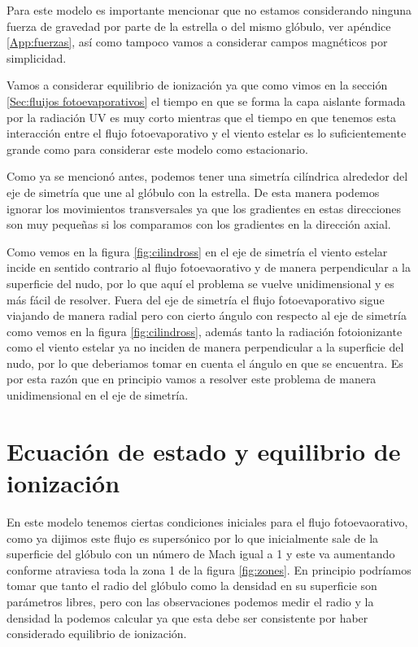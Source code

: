 \documentclass{book}
\begin{document}
Para este modelo es importante mencionar que no estamos considerando ninguna fuerza de gravedad por parte de la estrella o del mismo glóbulo, ver apéndice \ref{App:fuerzas}, así como tampoco vamos a considerar campos magnéticos por simplicidad.

Vamos a considerar equilibrio de ionización ya que como vimos en la sección \ref{Sec:fluijos fotoevaporativos} el tiempo en que se forma la capa aislante formada por la radiación UV es muy corto mientras que el tiempo en que tenemos esta interacción entre el flujo fotoevaporativo y el viento estelar es lo suficientemente grande como para considerar este modelo como estacionario.

Como ya se mencionó antes, podemos tener una simetría cilíndrica alrededor del eje de simetría que une al glóbulo con la estrella. De esta manera podemos ignorar los movimientos transversales ya que los gradientes en estas direcciones son muy pequeñas si los comparamos con los gradientes en la dirección axial.

Como vemos en la figura \ref{fig:cilindross} en el eje de simetría el viento estelar incide en sentido contrario al flujo fotoevaorativo y de manera perpendicular a la superficie del nudo, por lo que aquí el problema se vuelve unidimensional y es más fácil de resolver. Fuera del eje de simetría el flujo fotoevaporativo sigue viajando de manera radial pero con cierto ángulo con respecto al eje de simetría como vemos en la figura \ref{fig:cilindross}, además tanto la radiación fotoionizante como el viento estelar ya no inciden de manera perpendicular a la superficie del nudo, por lo que deberiamos tomar en cuenta el ángulo en que se encuentra. Es por esta razón que en principio vamos a resolver este problema de manera unidimensional en el eje de simetría.


\section{Ecuación de estado y equilibrio de ionización}

En este modelo tenemos ciertas condiciones iniciales para el flujo fotoevaorativo, como ya dijimos este flujo es supersónico por lo que inicialmente sale de la superficie del glóbulo con un número de Mach igual a 1 y este va aumentando conforme atraviesa toda la zona 1 de la figura \ref{fig:zones}. En principio podríamos tomar que tanto el radio del glóbulo como la densidad en su superficie son parámetros libres, pero con las observaciones podemos medir el radio y la densidad la podemos calcular ya que esta debe ser consistente por haber considerado equilibrio de ionización.
\end{document}
